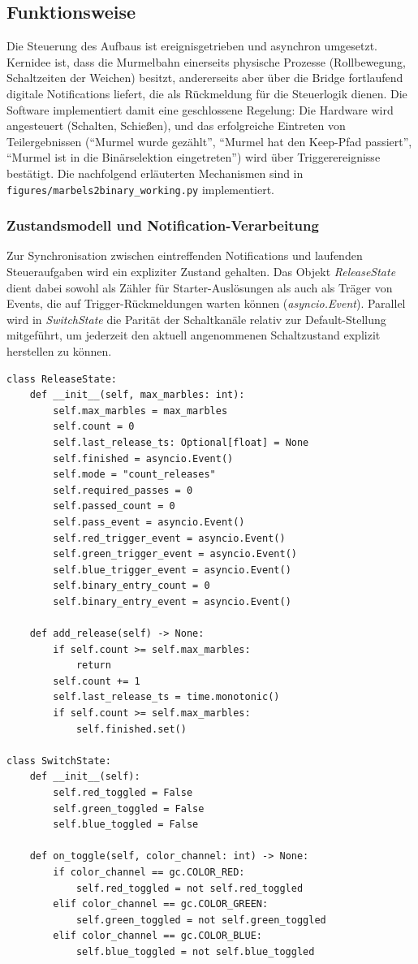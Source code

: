 \subsection{Funktionsweise}
Die Steuerung des Aufbaus ist ereignisgetrieben und asynchron umgesetzt. Kernidee ist, dass die Murmelbahn einerseits physische Prozesse (Rollbewegung, Schaltzeiten der Weichen) besitzt, andererseits aber über die Bridge fortlaufend digitale Notifications liefert, die als Rückmeldung für die Steuerlogik dienen. Die Software implementiert damit eine geschlossene Regelung: Die Hardware wird angesteuert (Schalten, Schießen), und das erfolgreiche Eintreten von Teilergebnissen (``Murmel wurde gezählt'', ``Murmel hat den Keep-Pfad passiert'', ``Murmel ist in die Binärselektion eingetreten'') wird über Triggerereignisse bestätigt. Die nachfolgend erläuterten Mechanismen sind in \texttt{figures/marbels2binary\_working.py} implementiert.

\subsubsection{Zustandsmodell und Notification-Verarbeitung}
Zur Synchronisation zwischen eintreffenden Notifications und laufenden Steueraufgaben wird ein expliziter Zustand gehalten. Das Objekt \emph{ReleaseState} dient dabei sowohl als Zähler für Starter-Auslösungen als auch als Träger von Events, die auf Trigger-Rückmeldungen warten können (\emph{asyncio.Event}). Parallel wird in \emph{SwitchState} die Parität der Schaltkanäle relativ zur Default-Stellung mitgeführt, um jederzeit den aktuell angenommenen Schaltzustand explizit herstellen zu können.

\begin{listing}[ht]
\caption{Zustandsobjekte zur Zählung und zur Verfolgung der Schaltparität}
\label{lst:state_objects}
\begin{verbatim}
class ReleaseState:
	def __init__(self, max_marbles: int):
		self.max_marbles = max_marbles
		self.count = 0
		self.last_release_ts: Optional[float] = None
		self.finished = asyncio.Event()
		self.mode = "count_releases"
		self.required_passes = 0
		self.passed_count = 0
		self.pass_event = asyncio.Event()
		self.red_trigger_event = asyncio.Event()
		self.green_trigger_event = asyncio.Event()
		self.blue_trigger_event = asyncio.Event()
		self.binary_entry_count = 0
		self.binary_entry_event = asyncio.Event()

	def add_release(self) -> None:
		if self.count >= self.max_marbles:
			return
		self.count += 1
		self.last_release_ts = time.monotonic()
		if self.count >= self.max_marbles:
			self.finished.set()

class SwitchState:
	def __init__(self):
		self.red_toggled = False
		self.green_toggled = False
		self.blue_toggled = False

	def on_toggle(self, color_channel: int) -> None:
		if color_channel == gc.COLOR_RED:
			self.red_toggled = not self.red_toggled
		elif color_channel == gc.COLOR_GREEN:
			self.green_toggled = not self.green_toggled
		elif color_channel == gc.COLOR_BLUE:
			self.blue_toggled = not self.blue_toggled
\end{verbatim}
\end{listing}

